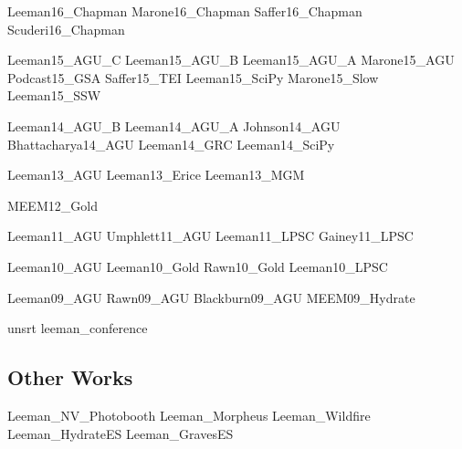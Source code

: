 \documentclass[letterpaper]{article}
\begin{document}
\begingroup
\renewcommand{\section}[2]{}

\nocite{conf}{Leeman16_Chapman}
\nocite{conf}{Marone16_Chapman}
\nocite{conf}{Saffer16_Chapman}
\nocite{conf}{Scuderi16_Chapman}

\nocite{conf}{Leeman15_AGU_C}
\nocite{conf}{Leeman15_AGU_B}
\nocite{conf}{Leeman15_AGU_A}
\nocite{conf}{Marone15_AGU}
\nocite{conf}{Podcast15_GSA}
\nocite{conf}{Saffer15_TEI}
\nocite{conf}{Leeman15_SciPy}
\nocite{conf}{Marone15_Slow}
\nocite{conf}{Leeman15_SSW}

\nocite{conf}{Leeman14_AGU_B}
\nocite{conf}{Leeman14_AGU_A}
\nocite{conf}{Johnson14_AGU}
\nocite{conf}{Bhattacharya14_AGU}
\nocite{conf}{Leeman14_GRC}
\nocite{conf}{Leeman14_SciPy}

\nocite{conf}{Leeman13_AGU}
\nocite{conf}{Leeman13_Erice}
\nocite{conf}{Leeman13_MGM}

\nocite{conf}{MEEM12_Gold}

\nocite{conf}{Leeman11_AGU}
\nocite{conf}{Umphlett11_AGU}
\nocite{conf}{Leeman11_LPSC}
\nocite{conf}{Gainey11_LPSC}

\nocite{conf}{Leeman10_AGU}
\nocite{conf}{Leeman10_Gold}
\nocite{conf}{Rawn10_Gold}
\nocite{conf}{Leeman10_LPSC}

\nocite{conf}{Leeman09_AGU}
\nocite{conf}{Rawn09_AGU}
\nocite{conf}{Blackburn09_AGU}
\nocite{conf}{MEEM09_Hydrate}


{unsrt}
{leeman_conference}{}
\endgroup

\subsection*{Other Works}

\begingroup
\renewcommand{\section}[2]{}

\nocite{other}{Leeman_NV_Photobooth}
\nocite{other}{Leeman_Morpheus}
\nocite{other}{Leeman_Wildfire}
\nocite{other}{Leeman_HydrateES}
\nocite{other}{Leeman_GravesES}
\end{document}

